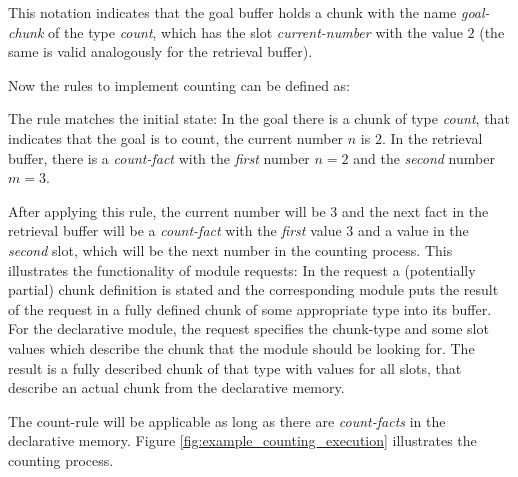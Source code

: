 This notation indicates that the goal buffer holds a chunk with the name \emph{goal-chunk} of the type \emph{count}, which has the slot \emph{current-number} with the value $2$ (the same is valid analogously for the retrieval buffer).

Now the rules to implement counting can be defined as:

\begin{center}
\end{center}

The rule matches the initial state: In the goal there is a chunk of type \emph{count}, that indicates that the goal is to count, the current number $n$ is $2$. In the retrieval buffer, there is a \emph{count-fact} with the \emph{first} number $n = 2$ and the \emph{second} number $m = 3$. 

After applying this rule, the current number will be $3$ and the next fact in the retrieval buffer will be a \emph{count-fact} with the \emph{first} value $3$ and a value in the \emph{second} slot, which will be the next number in the counting process. This illustrates the functionality of module requests: In the request a (potentially partial) chunk definition is stated and the corresponding module puts the result of the request in a fully defined chunk of some appropriate type into its buffer. For the declarative module, the request specifies the chunk-type and some slot values which describe the chunk that the module should be looking for. The result is a fully described chunk of that type with values for all slots, that describe an actual chunk from the declarative memory. 

The count-rule will be applicable as long as there are \emph{count-facts} in the declarative memory. Figure \ref{fig:example_counting_execution} illustrates the counting process.

